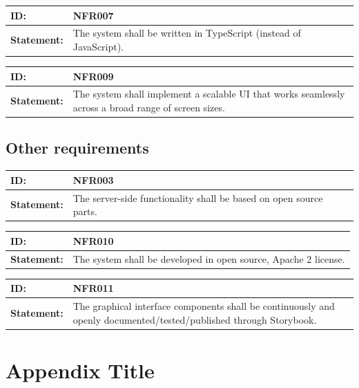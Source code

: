\documentclass{scrreprt}
\begin{document}
\begin{center}
\begin{tabularx}{\linewidth}{| l | X |}
 \hline
 \textbf{ID:} & NFR007  \\ 
 \hline
 \textbf{Statement:} & The system shall be written in TypeScript (instead of JavaScript).
 \\ 
 \hline
\end{tabularx}
\end{center}

\begin{center}
\begin{tabularx}{\linewidth}{| l | X |}
 \hline
 \textbf{ID:} & NFR009  \\ 
 \hline
 \textbf{Statement:} & The system shall implement a scalable UI that works seamlessly across a broad range of screen sizes.
 \\ 
 \hline
\end{tabularx}
\end{center}


\section{Other requirements}

\begin{center}
\begin{tabularx}{\linewidth}{| l | X |}
 \hline
 \textbf{ID:} & NFR003  \\ 
 \hline
 \textbf{Statement:} & The server-side functionality shall be based on open source parts.
 \\ 
 \hline
\end{tabularx}
\end{center}

\begin{center}
\begin{tabularx}{\linewidth}{| l | X |}
 \hline
 \textbf{ID:} & NFR010  \\ 
 \hline
 \textbf{Statement:} & The system shall be developed in open source, Apache 2 license.
 \\ 
 \hline
\end{tabularx}
\end{center}

\begin{center}
\begin{tabularx}{\linewidth}{| l | X |}
 \hline
 \textbf{ID:} & NFR011  \\ 
 \hline
 \textbf{Statement:} & The graphical interface components shall be continuously and openly documented/tested/published through Storybook.
 \\ 
 \hline
\end{tabularx}
\end{center}


\appendix
\chapter{Appendix Title}

\end{document}
